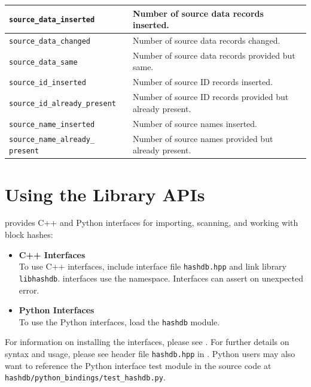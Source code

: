 \documentclass[11pt,fleqn]{article} %
\begin{document}
\begin{table}[!ht]
\begin{tabular}{|p{5 cm}|p{8.8 cm}|}
\verb+source_data_inserted+ &  Number of source data records inserted.\\
\hline
\verb+source_data_changed+ &  Number of source data records changed.\\
\hline
\verb+source_data_same+ &  Number of source data records provided but same.\\
\hline

\verb+source_id_inserted+ &  Number of source ID records inserted.\\
\hline
\verb+source_id_already_present+ &  Number of source ID records provided but already present.\\
\hline

\verb+source_name_inserted+ &  Number of source names inserted.\\
\hline
\verb+source_name_already_+ \verb+present+ &  Number of source names provided but already present.\\
\hline
\end{tabular}
\end{table}

\section{Using the \hdb Library APIs}
\label{APIs}
\hdb provides C++ and Python interfaces for importing, scanning, and working with block hashes:

\begin{itemize}
\item \textbf{C++ Interfaces}\\
To use C++ interfaces, include interface file \verb+hashdb.hpp+ and link \hdb library \verb+libhashdb+. \hdb interfaces use the \hdb namespace. Interfaces can assert on unexpected error.
\item \textbf{Python Interfaces}\\
To use the Python interfaces, load the \verb+hashdb+ module.
\end{itemize}

For information on installing the \hdb interfaces, please see \textbf{}.  For further details on syntax and usage, please see \hdb header file \texttt{hashdb.hpp} in \textbf{}. Python users may also want to reference the Python interface test module in the source code at \verb+hashdb/python_bindings/test_hashdb.py+.\\
\end{document}

